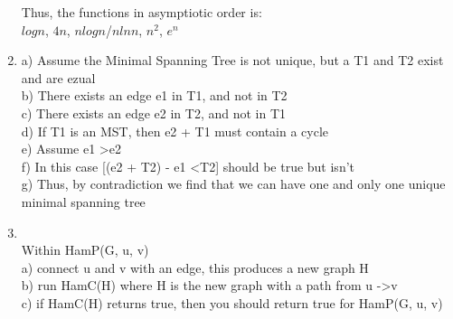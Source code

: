 \documentclass[11pt]{article}
\begin{document}
\begin{enumerate}
                    \tab Thus, the functions in asymptiotic order is: \\
                        \tab $logn$, $4n$, $nlogn$/$nlnn$, $n^2$, $e^n$ \\




                        \item
                        \tab a) Assume the Minimal Spanning Tree is not unique, but a T1 and T2 exist and are ezual \\
                            \tab b) There exists an edge e1 in T1, and not in T2 \\
                            \tab c) There exists an edge e2 in T2, and not in T1 \\
                            \tab d) If T1 is an MST, then e2 + T1 must contain a cycle \\
                            \tab e) Assume e1 \textgreater  e2 \\
                            \tab f) In this case [(e2 + T2) - e1 \textless  T2] should be true but isn't \\
                            \tab g) Thus, by contradiction we find that we can have one and only one unique minimal spanning tree \\

                            \item \\
                                \tab Within HamP(G, u, v)\\
                                \tab a) connect u and v with an edge, this produces a new graph H\\
                                \tab b) run HamC(H) where H is the new graph with a path from u -\textgreater v\\
                                \tab c) if HamC(H) returns true, then you should return true for HamP(G, u, v)\\

                                \end{enumerate}

                                
\end{document}

